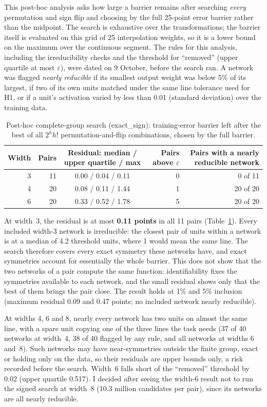 \documentclass[11pt]{article}
\newcommand{\md}[1]{\textsf{#1}}
\newcommand{\eps}{\varepsilon}
\begin{document}
This post-hoc analysis asks how large a barrier remains after searching \emph{every} permutation and sign flip and choosing by the full 25-point error barrier rather than the midpoint. The search is exhaustive over the transformations; the barrier itself is evaluated on this grid of 25 interpolation weights, so it is a lower bound on the maximum over the continuous segment. The rules for this analysis, including the irreducibility checks and the threshold for ``removed'' (upper quartile at most $\eps$), were dated on 9 October, before the search ran. A network was flagged \emph{nearly reducible} if its smallest output weight was below 5\% of its largest, if two of its own units matched under the same line tolerance used for H1, or if a unit's activation varied by less than 0.01 (standard deviation) over the training data.

\begin{table}[t]
\centering
\small
\caption{Post-hoc complete-group search (\md{exact\_sign}): training-error barrier left after the best of all $2^h h!$ permutation-and-flip combinations, chosen by the full barrier.}
\label{tab:b1}
\begin{tabular}{@{}rrcrr@{}}
\toprule
Width & Pairs & Residual: median / upper quartile / max & Pairs above $\eps$ & Pairs with a nearly reducible network \\
\midrule
3 & 11 & 0.00 / 0.04 / 0.11 & 0 & 0 of 11 \\
4 & 20 & 0.08 / 0.11 / 1.44 & 1 & 20 of 20 \\
6 & 20 & 0.33 / 0.52 / 1.78 & 5 & 20 of 20 \\
\bottomrule
\end{tabular}
\end{table}

At width~3, the residual is at most \textbf{0.11 points} in all 11 pairs (Table~\ref{tab:b1}). Every included width-3 network is irreducible: the closest pair of units within a network is at a median of 4.2 threshold units, where 1 would mean the same line. The search therefore covers every exact symmetry these networks have, and exact symmetries account for essentially the whole barrier. This does not show that the two networks of a pair compute the same function: identifiability fixes the symmetries available to each network, and the small residual shows only that the best of them brings the pair close. The result holds at 1\% and 5\% inclusion (maximum residual 0.09 and 0.47 points; no included network nearly reducible).

At widths 4, 6 and 8, nearly every network has two units on almost the same line, with a spare unit copying one of the three lines the task needs (37 of 40 networks at width~4, 38 of 40 flagged by any rule, and all networks at widths 6 and~8). Such networks may have near-symmetries outside the finite group, exact or holding only on the data, so their residuals are upper bounds only, a risk recorded before the search. Width~6 falls short of the ``removed'' threshold by 0.02 (upper quartile 0.517). I decided after seeing the width-6 result not to run the signed search at width~8 (10.3 million candidates per pair), since its networks are all nearly reducible.
\end{document}
